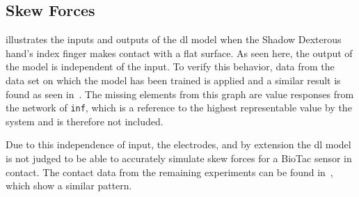 \subsection{Skew Forces} \label{sec:1-tactile-perception-results-skew-forces}

 illustrates the inputs and outputs of the \gls{dl} model when the Shadow Dexterous hand's index finger makes contact with a flat surface. As seen here, the output of the model is independent of the input. To verify this behavior, data from the data set on which the model has been trained is applied and a similar result is found as seen in~. The missing elements from this graph are value responses from the network of \texttt{inf}, which is a reference to the highest representable value by the system and is therefore not included. \medskip

Due to this independence of input, the electrodes, and by extension the \gls{dl} model is not judged to be able to accurately simulate skew forces for a BioTac sensor in contact. The contact data from the remaining experiments can be found in~, which show a similar pattern.

